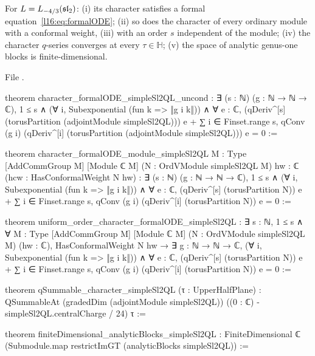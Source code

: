 \begin{theorem}\label{l16:thm:payoffL}
For $L = L_{-4/3}(\mathfrak{sl}_2)$: (i) its character satisfies a formal equation~\eqref{l16:eq:formalODE}; (ii) so does the
character of every ordinary module with a conformal weight, (iii) with an order $s$ independent of the module; (iv) the
character $q$-series converges at every $\tau\in\mathbb H$; (v) the space of analytic genus-one blocks is finite-dimensional.
\end{theorem}
\noindent File .
\begin{leancode}
theorem character_formalODE_simpleSl2QL_uncond :
    ∃ (s : ℕ) (g : ℕ → ℕ → ℂ), 1 ≤ s ∧ (∀ i, Subexponential (fun k => ‖g i k‖)) ∧
      ∀ e : ℂ, (qDeriv^[s] (torusPartition (adjointModule simpleSl2QL))) e
        + ∑ i ∈ Finset.range s,
            qConv (g i) (qDeriv^[i] (torusPartition (adjointModule simpleSl2QL))) e = 0 :=

theorem character_formalODE_module_simpleSl2QL {M : Type} [AddCommGroup M] [Module ℂ M]
    (N : OrdVModule simpleSl2QL M) {hw : ℂ} (hcw : HasConformalWeight N hw) :
    ∃ (s : ℕ) (g : ℕ → ℕ → ℂ), 1 ≤ s ∧ (∀ i, Subexponential (fun k => ‖g i k‖)) ∧
      ∀ e : ℂ, (qDeriv^[s] (torusPartition N)) e
        + ∑ i ∈ Finset.range s, qConv (g i) (qDeriv^[i] (torusPartition N)) e = 0 :=

theorem uniform_order_character_formalODE_simpleSl2QL :
    ∃ s : ℕ, 1 ≤ s ∧
      ∀ {M : Type} [AddCommGroup M] [Module ℂ M] (N : OrdVModule simpleSl2QL M) (hw : ℂ),
        HasConformalWeight N hw →
          ∃ g : ℕ → ℕ → ℂ, (∀ i, Subexponential (fun k => ‖g i k‖)) ∧
            ∀ e : ℂ, (qDeriv^[s] (torusPartition N)) e
              + ∑ i ∈ Finset.range s,
                  qConv (g i) (qDeriv^[i] (torusPartition N)) e = 0 :=

theorem qSummable_character_simpleSl2QL (τ : UpperHalfPlane) :
    QSummableAt (gradedDim (adjointModule simpleSl2QL))
      ((0 : ℂ) - simpleSl2QL.centralCharge / 24) τ :=

theorem finiteDimensional_analyticBlocks_simpleSl2QL :
    FiniteDimensional ℂ (Submodule.map restrictImGT (analyticBlocks simpleSl2QL)) :=
\end{leancode}

